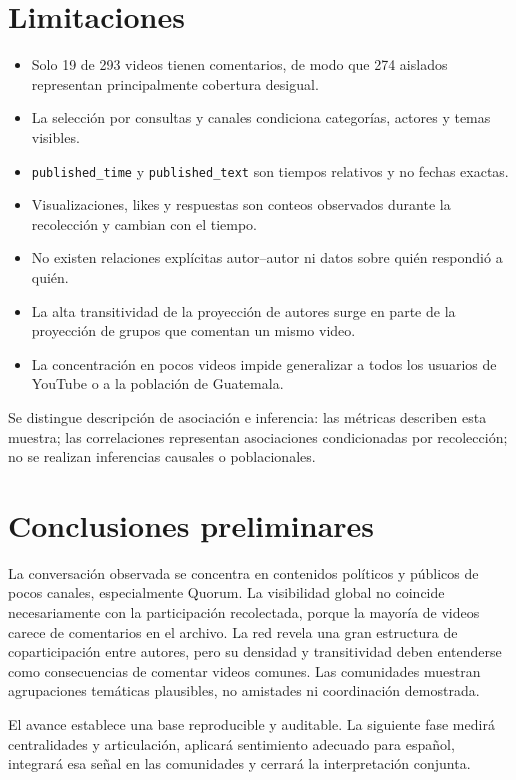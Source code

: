 \documentclass[11pt]{article}
\begin{document}
\section{Limitaciones}

\begin{itemize}
  \item Solo 19 de 293 videos tienen comentarios, de modo que 274 aislados representan principalmente cobertura desigual.
  \item La selección por consultas y canales condiciona categorías, actores y temas visibles.
  \item \texttt{published\_time} y \texttt{published\_text} son tiempos relativos y no fechas exactas.
  \item Visualizaciones, likes y respuestas son conteos observados durante la recolección y cambian con el tiempo.
  \item No existen relaciones explícitas autor--autor ni datos sobre quién respondió a quién.
  \item La alta transitividad de la proyección de autores surge en parte de la proyección de grupos que comentan un mismo video.
  \item La concentración en pocos videos impide generalizar a todos los usuarios de YouTube o a la población de Guatemala.
\end{itemize}

Se distingue descripción de asociación e inferencia: las métricas describen esta muestra; las correlaciones representan asociaciones condicionadas por recolección; no se realizan inferencias causales o poblacionales.

\section{Conclusiones preliminares}

La conversación observada se concentra en contenidos políticos y públicos de pocos canales, especialmente Quorum. La visibilidad global no coincide necesariamente con la participación recolectada, porque la mayoría de videos carece de comentarios en el archivo. La red revela una gran estructura de coparticipación entre autores, pero su densidad y transitividad deben entenderse como consecuencias de comentar videos comunes. Las comunidades muestran agrupaciones temáticas plausibles, no amistades ni coordinación demostrada.

El avance establece una base reproducible y auditable. La siguiente fase medirá centralidades y articulación, aplicará sentimiento adecuado para español, integrará esa señal en las comunidades y cerrará la interpretación conjunta.
\end{document}
